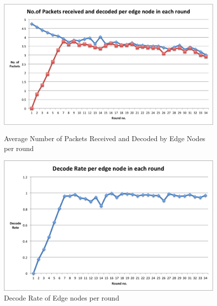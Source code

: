 \documentclass{acm_proc_article-sp}
\begin{document}
\begin{figure}[ht]
\begin{minipage}[b]{0.50\linewidth}
\centering
\includegraphics[width=\textwidth]{numpacketrecdecodeperroundperedge.png}
\caption{Average Number of Packets Received and Decoded by Edge Nodes per round}
\label{numpacketrecdecodeperroundperedge}
\end{minipage}
\hspace{0.5cm}
\begin{minipage}[b]{0.50\linewidth}
\centering
\includegraphics[width=\textwidth]{decoderateperroundperedge.png}
\caption{Decode Rate of Edge nodes per round}
\label{decoderateperroundperedge}
\end{minipage}
\end{figure}
\end{document}
